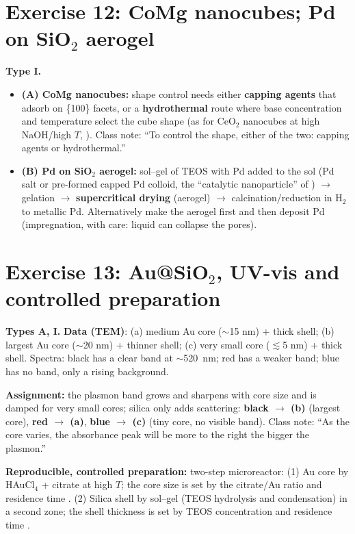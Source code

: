 \section{Exercise 12: CoMg nanocubes; Pd on SiO$_2$ aerogel}
\textbf{Type I.}
\begin{itemize}
  \item \textbf{(A) CoMg nanocubes:} shape control needs either \textbf{capping agents} that adsorb on \{100\} facets, or a
        \textbf{hydrothermal} route where base concentration and temperature select the cube shape (as for CeO$_2$
        nanocubes at high NaOH/high $T$, ). Class note: ``To control the shape, either of the two: capping agents or
        hydrothermal.''
  \item \textbf{(B) Pd on SiO$_2$ aerogel:} sol--gel of TEOS with Pd added to the sol (Pd salt or pre-formed capped Pd
        colloid, the ``catalytic nanoparticle'' of ) $\to$ gelation $\to$ \textbf{supercritical drying} (aerogel)
        $\to$ calcination/reduction in H$_2$ to metallic Pd. Alternatively make the aerogel first and then deposit Pd
        (impregnation, with care: liquid can collapse the pores\extra).
\end{itemize}

\section{Exercise 13: Au@SiO$_2$, UV-vis and controlled preparation}
\textbf{Types A, I.} \textbf{Data (TEM)}\readoff: (a) medium Au core ($\sim$15 nm) + thick shell; (b) largest Au core
($\sim$20 nm) + thinner shell; (c) very small core ($\lesssim$5 nm) + thick shell. Spectra: black has a clear band at
$\sim$\SI{520}{nm}; red has a weaker band; blue has no band, only a rising background.

\textbf{Assignment:} the plasmon band grows and sharpens with core size and is damped for very small cores; silica only
adds scattering:
\textbf{black $\to$ (b)} (largest core), \textbf{red $\to$ (a)}, \textbf{blue $\to$ (c)} (tiny core, no visible band).
Class note: ``As the core varies, the absorbance peak will be more to the right the bigger the plasmon.''

\textbf{Reproducible, controlled preparation:} two-step microreactor: (1) Au core by HAuCl$_4$ + citrate at high $T$; the core
size is set by the citrate/Au ratio and residence time . (2) Silica shell by sol--gel (TEOS hydrolysis and
condensation) in a second zone; the shell thickness is set by TEOS concentration and residence time .

